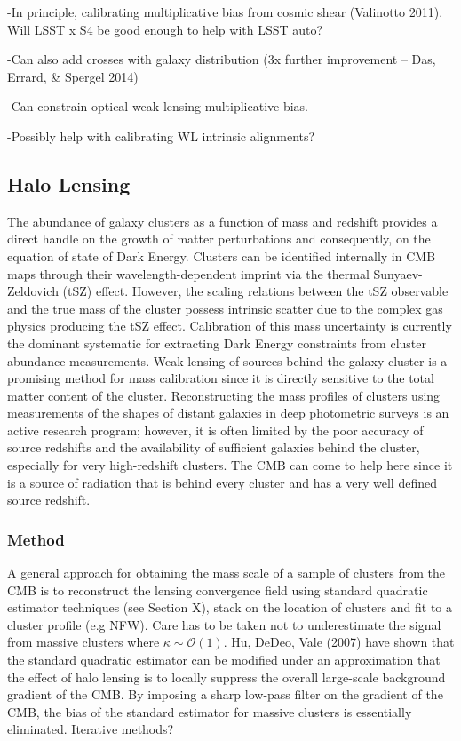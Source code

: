 -In principle, calibrating multiplicative bias from cosmic shear (Valinotto 2011).  Will LSST x S4 be good enough to help with LSST auto?

-Can also add crosses with galaxy distribution (3x further improvement -- Das, Errard, \& Spergel 2014)

-Can constrain optical weak lensing multiplicative bias.

-Possibly help with calibrating WL intrinsic alignments?

\subsection{Halo Lensing}


The abundance of galaxy clusters as a function of mass and redshift provides a direct handle on the growth of matter perturbations and consequently, on the equation of state of Dark Energy. Clusters can be identified internally in CMB maps through their wavelength-dependent imprint via the thermal Sunyaev-Zeldovich (tSZ) effect. However, the scaling relations between the tSZ observable and the true mass of the cluster possess intrinsic scatter due to the complex gas physics producing the tSZ effect. Calibration of this mass uncertainty is currently the dominant systematic for extracting Dark Energy constraints from cluster abundance measurements. Weak lensing of sources behind the galaxy cluster is a promising method for mass calibration since it is directly sensitive to the total matter content of the cluster. Reconstructing the mass profiles of clusters using measurements of the shapes of distant galaxies in deep photometric surveys is an active research program; however, it is often limited by the poor accuracy of source redshifts and the availability of sufficient galaxies behind the cluster, especially for very high-redshift clusters. The CMB can come to help here since it is a source of radiation that is behind every cluster and has a very well defined source redshift.

\subsubsection{Method}

A general approach for obtaining the mass scale of a sample of clusters from the CMB is to reconstruct the lensing convergence field using standard quadratic estimator techniques (see Section X), stack on the location of clusters and fit to a cluster profile (e.g NFW). Care has to be taken not to underestimate the signal from massive clusters where $\kappa\sim\mathcal{O}(1)$. Hu, DeDeo, Vale (2007) have shown that the standard quadratic estimator can be modified under an approximation that the effect of halo lensing is to locally suppress the overall large-scale background gradient of the CMB. By imposing a sharp low-pass filter on the gradient of the CMB, the bias of the standard estimator for massive clusters is essentially eliminated. Iterative methods?

